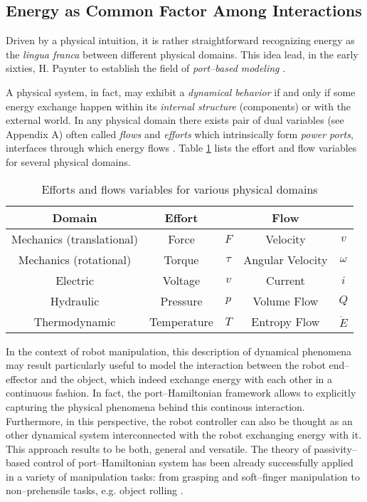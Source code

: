 \subsection{Energy as Common Factor Among Interactions}\label{subsec:comm_fact}
%
Driven by a physical intuition, it is rather straightforward recognizing energy as the \textit{lingua franca} between different physical domains. This idea lead, in the early sixties, H. Paynter to establish the field of \textit{port--based modeling} \cite{paynter1961analysis}.
%
\newline

%
A physical system, in fact, may exhibit a \textit{dynamical behavior} if and only if some energy exchange happen within its \textit{internal structure} (components) or with the external world. In any physical domain there exists pair of dual variables (see Appendix A) often called \textit{flows} and \textit{efforts} which intrinsically form \textit{power ports}, interfaces through which energy flows \cite{secchi2007control}. Table \ref{tab:ef} lists the effort and flow variables for several physical domains.
%
\begin{table}[t]
	\centering
	\begin{tabular}{|c|cc|cc|} \hline
			\rowcolor{gray!50}\textbf{Domain}&{\centering \textbf{Effort}}&&{\centering \textbf{Flow}}&\\\hline
			Mechanics (translational)&Force&$F$&Velocity&$v$\\\hline
			\rowcolor{gray!15}Mechanics (rotational)&Torque &$\tau$&Angular Velocity &$\omega$\\\hline
			Electric&Voltage &$v$&Current &$i$\\\hline
			\rowcolor{gray!15}Hydraulic&Pressure& $p$&Volume Flow &$Q$\\\hline
			Thermodynamic&Temperature &$T$&Entropy Flow &$\dot{E}$\\\hline
	\end{tabular}
	\caption{Efforts and flows variables for various physical domains}
	\label{tab:ef}
\end{table}
%
\newline

In the context of robot manipulation, this description of dynamical phenomena may result particularly useful to model the interaction between the robot end--effector and the object, which indeed exchange energy with each other in a continuous fashion.
%
In fact, the port--Hamiltonian framework allows to explicitly capturing the physical phenomena behind this continous interaction. Furthermore, in this perspective, the robot controller can also be thought as an other dynamical system interconnected with the robot exchanging energy with it. 
This approach results to be both, general and versatile.
%
The theory of passivity--based control of port--Hamiltonian system has been already successfully applied in a variety of manipulation tasks: from grasping \cite{stramigioli99} and soft--finger manipulation \cite{ficuciello2010} to non--prehensile tasks, e.g. object rolling \cite{donaire2017,serra2019}.
%
\newline

